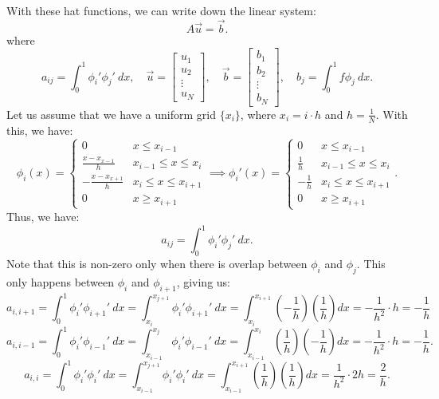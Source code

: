 \documentclass[../main/main.tex]{subfiles}
\begin{document}
   With these hat functions, we can write down the linear system: \[
       A \vec{u} = \vec{b}
   .\] where \[
       a_{ij} = \int^1_0 \phi_i' \phi_j'~dx ,\quad \vec{u} = \begin{bmatrix} u_1 \\ u_2 \\ \vdots \\ u_N \end{bmatrix} , \quad \vec{b} = \begin{bmatrix} b_1\\ b_2 \\ \vdots \\ b_N \end{bmatrix} , \quad b_j = \int^1_0 f \phi_j~dx
   .\] Let us assume that we have a uniform grid $\{x_i\} $, where $x_i = i \cdot  h$ and $h = \frac{1}{N}$. With this, we have: \[
   \phi_i(x) = \begin{cases}
       0 & x \le  x_{i-1} \\
       \frac{x-x_{x-1}}{h} & x_{i-1} \le  x \le  x_i \\
       -\frac{x-x_{x+1}}{h} & x_i \le  x \le  x_{i+1} \\
       0 & x \ge  x_{i+1}
   \end{cases} \implies \phi_i'(x) = \begin{cases}
       0 & x \le  x_{i-1} \\
      \frac{1}{h}& x_{i-1} \le  x \le  x_i \\
       -\frac{1}{h}& x_i \le  x \le  x_{i+1} \\
       0 & x \ge  x_{i+1}
   \end{cases}
   .\] Thus, we have: \[
   a_{ij} = \int^1_0 \phi_i' \phi_j'~dx
   .\] Note that this is non-zero only when there is overlap between $\phi_i$ and  $\phi_j$. This only happens between  $\phi_i$ and  $\phi_{i+1}$, giving us:  \[
   a_{i,i+1} = \int^1_0 \phi_i' \phi_{i+1}'~dx = \int_{x_i}^{x_{j+1}}\phi_i'\phi_{i+1}' ~dx = \int_{x_i}^{x_{i+1}}\left( -\frac{1}{h} \right)\left( \frac{1}{h} \right)dx =  -\frac{1}{h^2}\cdot h = -\frac{1}{h}
   \]\[ 
   a_{i,i-1} = \int^1_0 \phi_i' \phi_{i-1}'~dx = \int_{x_{i-1}}^{x_{j}}\phi_i'\phi_{i-1}' ~dx = \int_{x_{i-1}}^{x_{i}}\left( \frac{1}{h} \right)\left( -\frac{1}{h} \right)dx =  -\frac{1}{h^2}\cdot h = -\frac{1}{h}
   .\] 
\[ 
    a_{i,i} = \int^1_0 \phi_i' \phi_{i}'~dx = \int_{x_{i-1}}^{x_{j+1}}\phi_i'\phi_{i}' ~dx = \int_{x_{i-1}}^{x_{i+1}}\left( \frac{1}{h} \right)\left( \frac{1}{h} \right)dx =  \frac{1}{h^2}\cdot 2h = \frac{2}{h}
.\] 
\end{document}
